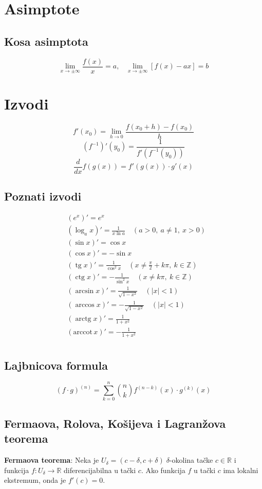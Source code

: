 \documentclass[a4paper,12pt,twoside]{report}
\numberwithin{algorithm}{section}
\renewcommand{\tan}{\operatorname{tg}}
\renewcommand{\cot}{\operatorname{ctg}}
\renewcommand{\arctan}{\operatorname{arctg}}
\begin{document}
\section{Asimptote}
\subsection{Kosa asimptota}
\[
    \lim_{x\to\pm\infty} \frac{f(x)}{x} = a, \;\;\; \lim_{x\to\pm\infty} [f(x) - ax] = b
\]

\section{Izvodi}
\[ f'(x_0) = \lim_{h \to 0}\frac{f(x_0 + h) - f(x_0)}{h} \]
\[ (f^{-1})'(y_0) = \frac{1}{f'(f^{-1}(y_0))} \]
\[
    \frac{d}{dx} f(g(x)) = f'(g(x))\cdot g'(x)
\]
\subsection{Poznati izvodi}
\begin{align*}
&(e^x)' = e^x \\
&(\log_a x)' = \frac{1}{x \ln a} \quad (a > 0,\ a \neq 1,\ x > 0) \\
&(\sin x)' = \cos x \\
&(\cos x)' = -\sin x \\
&(\tan x)' = \frac{1}{\cos^2 x} \quad (x \neq \frac{\pi}{2} + k\pi,\ k \in \mathbb{Z}) \\
&(\cot x)' = -\frac{1}{\sin^2 x}  \quad (x \neq k\pi,\ k \in \mathbb{Z}) \\
&(\arcsin x)' = \frac{1}{\sqrt{1 - x^2}} \quad (|x| < 1) \\
&(\arccos x)' = -\frac{1}{\sqrt{1 - x^2}} \quad (|x| < 1) \\
&(\arctan x)' = \frac{1}{1 + x^2} \\
&(\text{arccot}\, x)' = -\frac{1}{1 + x^2} \\
\end{align*}
\subsection{Lajbnicova formula}
\[
(f \cdot g)^{(n)} = \sum^n_{k=0}{{n}\choose k} f^{(n-k)}(x) \cdot g^{(k)}(x)
\]
\newpage
\subsection{Fermaova, Rolova, Košijeva i Lagranžova teorema}

\noindent\textbf{Fermaova teorema}: Neka je $U_\delta = (c - \delta,c + \delta) \;\delta$-okolina tačke $c \in \mathbb{R}$ i funkcija $f:U_\delta \xrightarrow{}\mathbb{R}$ diferencijabilna u tački $c$. Ako funkcija $f$ u tački $c$ ima lokalni ekstremum, onda je $f'(c) = 0.$\\
\end{document}
